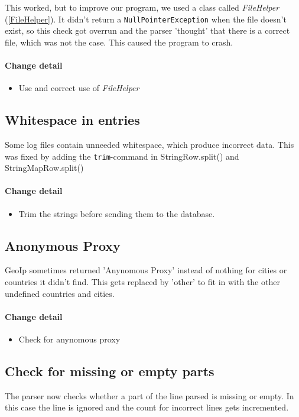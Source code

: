 This worked, but to improve our program, we used a class called \textit{FileHelper} (\ref{FileHelper}). 
It didn't return a \texttt{NullPointerException} when the file doesn't exist, 
so this check got overrun and the parser 'thought' that there is a correct file, which was not the case.
This caused the program to crash. 

\paragraph{Change detail}
\begin{itemize}
  \item Use and correct use of \textit{FileHelper}
\end{itemize}

\subsection{Whitespace in entries}
Some log files contain unneeded whitespace, which produce incorrect data. 
This was fixed by adding the \texttt{trim}-command in StringRow.split() and StringMapRow.split()

\paragraph{Change detail}
\begin{itemize}
  \item Trim the strings before sending them to the database.
\end{itemize}

\subsection{Anonymous Proxy}
GeoIp sometimes returned 'Anynomous Proxy' instead of nothing for cities or countries it didn't find.
This gets replaced by 'other' to fit in with the other undefined countries and cities.


\paragraph{Change detail}
\begin{itemize}
  \item Check for anynomous proxy
\end{itemize}

\subsection{Check for missing or empty parts}
The parser now checks whether a part of the line parsed is missing or empty. In this case the line is ignored and 
the count for incorrect lines gets incremented.

